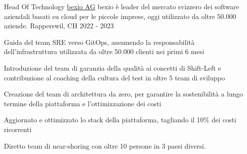 
\begin{cventries}
  \cventry
    {Head Of Technology} %
    {\href{https://www.bexio.com}{bexio AG}} %
    {bexio è leader del mercato svizzero dei software aziendali basati su cloud per le piccole imprese, oggi utilizzato da oltre 50.000 aziende.} %
    {Rapperswil, CH} %
    {2022 - 2023} %
    {
      \begin{cvitems} %
      	\item {Guida del team SRE verso GitOps, assumendo la responsabilità dell'infrastruttura utilizzata da oltre 50.000 clienti nei primi 6 mesi}
      	\item {Introduzione del team di garanzia della qualità ai concetti di Shift-Left e contribuzione al coaching della cultura del test in oltre 5 team di sviluppo}
        \item {Creazione del team di architettura da zero, per garantire la sostenibilità a lungo termine della piattaforma e l'ottimizzazione dei costi}
        \item {Aggiornato e ottimizzato lo stack della piattaforma, tagliando il 10\% dei costi ricorrenti}
        \item {Diretto team di near-shoring con oltre 10 persone in 3 paesi diversi.}
      \end{cvitems}
    }


\end{cventries}
